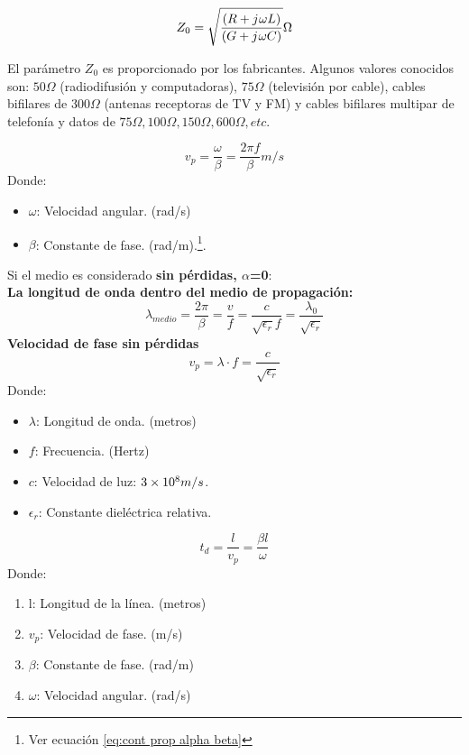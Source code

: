 \documentclass[
	12pt, %
	fleqn, %
	a4paper, %
	oneside, %
]{LegrandOrangeBook}
\begin{document}
\begin{definition}
\begin{equation}
Z_0=\sqrt{\frac{\left(R+{j\mkern1mu}\omega L\right)}{\left(G+{j\mkern1mu}\omega C\right)}}\Omega
\label{eq: imp carac}
\end{equation}
\end{definition}
\begin{remark}
El parámetro $Z_0$ es proporcionado por los fabricantes. Algunos valores conocidos son: $50\Omega$ (radiodifusión y computadoras), $75\Omega$ (televisión por cable), cables bifilares de $300\Omega$ (antenas receptoras de TV y FM) y cables bifilares multipar de telefonía y datos de $75\Omega, 100\Omega, 150\Omega, 600\Omega, etc$.
\end{remark}
\begin{definition}
\begin{equation}
v_p=\frac{\omega}{\beta}=\frac{2\pi f}{\beta}m/s
\label{eq:vel fase}
\end{equation}
Donde:
\begin{itemize}
\item $\omega$: Velocidad angular. (rad/s)
\item $\beta$: Constante de fase. (rad/m).\footnote{Ver ecuación \ref{eq:cont prop alpha beta}}.
\end{itemize}
Si el medio es considerado \textbf{sin pérdidas, $\alpha$=0}:\\
\textbf{La longitud de onda dentro del medio de propagación:}
\begin{equation}
\lambda_{medio}=\frac{2\pi}{\beta}=\frac{v}{f}=\frac{c}{\sqrt{\epsilon_r}f}=\frac{\lambda_0}{\sqrt{\epsilon_r}}
\label{eq:longitud de onda sin perdidas}
\end{equation}
\textbf{Velocidad de fase sin pérdidas}
\begin{equation}
v_p=\lambda\cdot f=\frac{c}{\sqrt{\epsilon_r}}
\label{eq:vel fase sin perdidas}
\end{equation}
Donde:
\begin{itemize}
\item $\lambda$: Longitud de onda. (metros)
\item $f$: Frecuencia. (Hertz)
\item $c$: Velocidad de luz: $3\times 10^{8} m/s$.
\item $\epsilon_r$: Constante dieléctrica relativa.
\end{itemize}
\end{definition}
\begin{definition}
\begin{equation}
t_d=\frac{l}{v_p}=\frac{\beta l}{\omega}
\label{eq:tiempo retardo linea}
\end{equation}
Donde:
\begin{enumerate}
\item l: Longitud de la línea. (metros)
\item $v_p$: Velocidad de fase. (m/s)
\item $\beta$: Constante de fase. (rad/m)
\item $\omega$: Velocidad angular. (rad/s)
\end{enumerate}
\end{definition}
\end{document}
